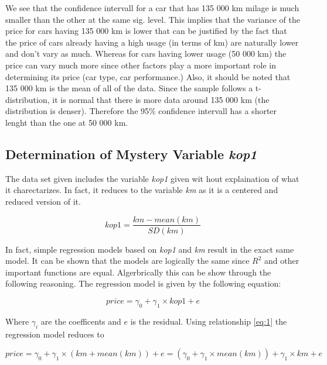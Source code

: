 \noindent
We see that the confidence intervall for a car that has 135 000 km milage is much smaller than the other at the same sig. level. This implies that the variance of the price for cars having 135 000 km is lower that can be justified by the fact that the price of cars already having a high usage (in terms of km) are naturally lower and don't vary as much. Whereas for cars having lower usage (50 000 km) the price can vary much more since other factors play a more important role in determining its price (car type, car performance.) Also, it should be noted that 135 000 km is the mean of all of the data. Since the sample follows a t-distribution, it is normal that there is more data around 135 000 km (the distribution is denser). Therefore the 95\% confidence intervall has a shorter lenght than the one at 50 000 km.

\subsection{Determination of Mystery Variable \textit{kop1}} %
\label{sub:det_myst_var}

The data set given includes the variable \textit{kop1} given wit hout explaination of what it charectarizes. In fact, it reduces to the variable \textit{km} as it is a centered and reduced version of it.

\begin{equation}\label{eq:1}
	kop1 = \frac{km - mean(km)}{SD(km)}
\end{equation}

\noindent
In fact, simple regression models based on \textit{kop1} and \textit{km} result in the exact same model. It can be shown that the models are logically the same since $R^2$ and other important functions are equal. Algerbrically this can be show through the following reasoning. The regression model is given by the following equation:

\begin{equation}\label{eq:price_kop1}
	price = \gamma_0 + \gamma_1 \times kop1 + e
\end{equation}

\noindent
Where $\gamma_i$ are the coefficents and $e$ is the residual. Using relationship \ref{eq:1} the regression model reduces to

\begin{equation}
	 price = \gamma_0 + \gamma_1 \times (km + mean(km))+ e = (\gamma_0 + \gamma_1 \times mean(km)) + \gamma_1 \times km + e
\end{equation}

